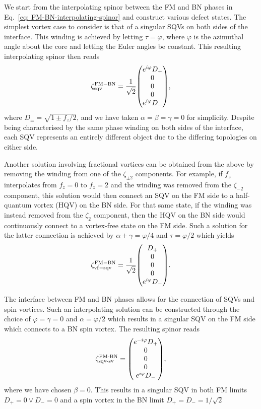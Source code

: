 We start from the interpolating spinor between the FM and BN phases in
Eq.~\eqref{eq: FM-BN-interpolating-spinor} and construct various defect states.
The simplest vortex case to consider is that of a singular SQVs on both sides of
the interface.
This winding is achieved by letting \(\tau = \varphi \), where \(\varphi \) is
the azimuthal angle about the core and letting the Euler angles be constant.
This resulting interpolating spinor then reads
\begin{equation}
    \zeta^\mathrm{FM-BN}_\mathrm{sqv} =
    \frac{1}{\sqrt{2}}\mqty(e^{i\varphi}D_+ \\ 0 \\ 0 \\ 0 \\
    e^{i\varphi}D_-),
\end{equation}
where \(D_\pm = \sqrt{1 \pm f_z / 2}\), and we have taken
\(\alpha=\beta=\gamma=0\) for simplicity.
Despite being characterised by the same phase winding on both sides of the
interface, each SQV represents an entirely different object due to the
differing topologies on either side.

Another solution involving fractional vortices can be obtained from the
above by removing the winding from one of the \(\zeta_{\pm 2}\) components.
For example, if \(f_z\) interpolates from \(f_z=0\) to \(f_z=2\) and the winding
was removed from the \(\zeta_{-2}\) component, this solution would then connect
an SQV on the FM side to a half-quantum vortex (HQV) on the BN side.
For that same state, if the winding was instead removed from the \(\zeta_{2}\)
component, then the HQV on the BN side would continuously connect to a
vortex-free state on the FM side.
Such a solution for the latter connection is achieved by
\(\alpha + \gamma = \varphi / 4\) and \(\tau=\varphi / 2\) which yields
\begin{equation}
    \zeta^\mathrm{FM-BN}_\mathrm{vf-sqv} =
    \frac{1}{\sqrt{2}}\mqty(D_+ \\ 0 \\ 0 \\ 0 \\
    e^{i\varphi}D_-).
\end{equation}

The interface between FM and BN phases allows for the connection of SQVs and
spin vortices.
Such an interpolating solution can be constructed through the
choice of \(\varphi=\gamma=0\) and \(\alpha=\varphi/2\) which results in a
singular SQV on the FM side which connects to a BN spin vortex.
The resulting spinor reads
\begin{equation}
    \zeta^\text{FM-BN}_\text{sqv-sv} =
    \mqty(e^{-i\varphi}D_+ \\ 0 \\ 0 \\ 0 \\
    e^{i\varphi}D_-),
\end{equation}
where we have chosen \(\beta = 0\).
This results in a singular SQV in both FM limits \(D_+ = 0 \vee D_- = 0\) and
a spin vortex in the BN limit \(D_+ = D_- = 1/\sqrt{2}\)

